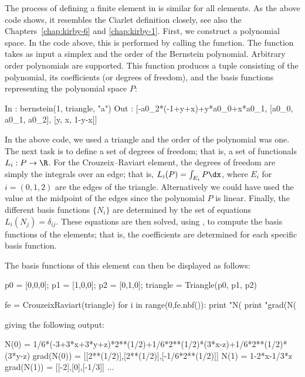\vspace*{2pt}

\noindent The process of defining a finite element in \syfi{} is similar for all
elements.  As the above code shows, it resembles the Ciarlet
definition closely, see also the Chapters~\ref{chap:kirby-6}
and \ref{chap:kirby-1}. First, we construct a polynomial space. In
the code above, this is performed by calling the 
function. The  function takes as input a simplex and
the order of the Bernstein polynomial. Arbitrary order polynomials are
supported. This function produces a tuple consisting of the
polynomial, its coefficients (or degrees of freedom), and the basis
functions representing the polynomial space $P$:
\begin{python}
In  : bernstein(1, triangle, "a")
Out : [-a0_2*(-1+y+x)+y*a0_0+x*a0_1, [a0_0, a0_1, a0_2], [y, x, 1-y-x]]
\end{python}

\vspace*{2pt}

\noindent In the above code, we used a triangle and the order of the polynomial
was one. The next task is to define a set of degrees of freedom; that is,
a set of functionals $L_i : P \rightarrow \R$. For the Crouzeix--Raviart
element, the degrees of freedom \pagebreak are simply the integrals over an edge;
that is, $L_i(P) = \int_{E_i} P \dx$, where $E_i$ for $i=(0,1,2)$ are the
edges of the triangle. Alternatively we could have used the value at
the midpoint of the edges since the polynomial $P$ is linear.  Finally,
the different basis functions $\{N_i\}$ are determined by the set of
equations $L_i(N_j) = \delta_{ij}$.  These equations are then solved,
using , to compute the basis functions of the elements;
that is, the coefficients \emp{[a0\_0, a0\_1, a0\_2]} are determined for
each specific basis function.

The basis functions of this element can then be displayed as follows:
\begin{python}
p0 = [0,0,0]; p1 = [1,0,0]; p2 = [0,1,0];
triangle = Triangle(p0, p1, p2)

fe = CrouzeixRaviart(triangle)
for i in range(0,fe.nbf()):
  print "N(%
  print "grad(N(%
\end{python}

\vspace*{1.5pt}

\noindent giving the following output:
\begin{c++}
N(0)       =  1/6*(-3+3*x+3*y+z)*2**(1/2)+1/6*2**(1/2)*(3*x-z)+1/6*2**(1/2)*(3*y-z)
grad(N(0)) =  [[2**(1/2)],[2**(1/2)],[-1/6*2**(1/2)]]
N(1)       =  1-2*x-1/3*z
grad(N(1)) =  [[-2],[0],[-1/3]]
...
\end{c++}


